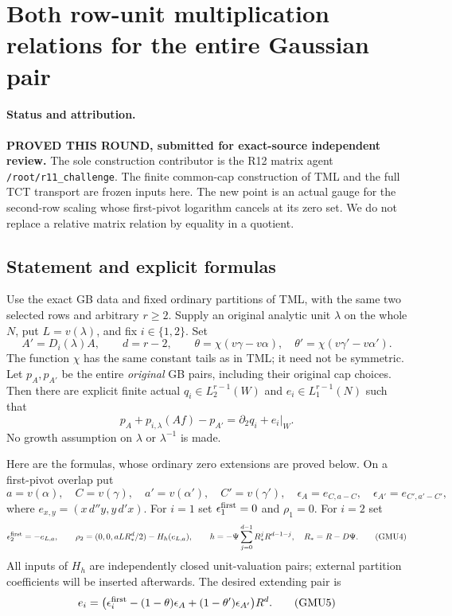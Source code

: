 \section{Both row-unit multiplication relations for the entire Gaussian pair}
\label{sec:r12-gaussian-row-unit-multiplication}

\paragraph{Status and attribution.}
\textbf{PROVED THIS ROUND, submitted for exact-source independent review.}
The sole construction contributor is the R12 matrix agent
\texttt{/root/r11\_challenge}.  The finite common-cap construction
of TML and the full TCT transport are frozen inputs here.  The new
point is an actual gauge for the second-row scaling whose first-pivot
logarithm cancels at its zero set.  We do not replace a relative
matrix relation by equality in a quotient.

\subsection{Statement and explicit formulas}

Use the exact GB data and fixed ordinary partitions of TML, with
the same two selected rows and arbitrary $r\ge2$.  Supply an original
analytic unit $\lambda$ on the whole $N$, put $L=v(\lambda)$,
and fix $i\in\{1,2\}$.  Set
\[
 A'=D_i(\lambda)A,\qquad d=r-2,
 \qquad \theta=\chi(v\gamma-v\alpha),\quad
       \theta'=\chi(v\gamma'-v\alpha').
 \tag{GMU1}
\]
The function $\chi$ has the same constant tails as in TML; it need
not be symmetric.  Let $p_A,p_{A'}$ be the entire \emph{original}
GB pairs, including their original cap choices.  Then there are
explicit finite actual $q_i\in L_2^{r-1}(W)$ and
$e_i\in L_1^{r-1}(N)$ such that
\[
         p_A+p_{i,\lambda}(Af)-p_{A'}
                            =\partial_2q_i+e_i|_W.
 \tag{GMU2}
\]
No growth assumption on $\lambda$ or $\lambda^{-1}$ is made.

Here are the formulas, whose ordinary zero extensions are proved
below.  On a first-pivot overlap put
\[
 a=v(\alpha),\quad C=v(\gamma),\quad
 a'=v(\alpha'),\quad C'=v(\gamma'),\quad
 \epsilon_A=e_{C,a-C},\quad
 \epsilon_{A'}=e_{C',a'-C'},
 \tag{GMU3}
\]
where $e_{x,y}=(x\,d''y,y\,d'x)$.  For $i=1$ set
$\epsilon^{\rm first}_1=0$ and $\rho_1=0$.
For $i=2$ set
\[
 \epsilon^{\rm first}_2=-e_{L,a},\qquad
 \rho_2=(0,0,aL R_*^d/2)-H_h(e_{L,a}),\qquad
 h=-\Psi\sum_{j=0}^{d-1}R_*^jR^{d-1-j},\quad R_*=R-D\Psi.
 \tag{GMU4}
\]
All inputs of $H_h$ are independently closed unit-valuation pairs;
external partition coefficients will be inserted afterwards.
The desired extending pair is
\[
 e_i=\bigl(\epsilon^{\rm first}_i
          -(1-\theta)\epsilon_A
          +(1-\theta')\epsilon_{A'}\bigr)R^d.
 \tag{GMU5}
\]

